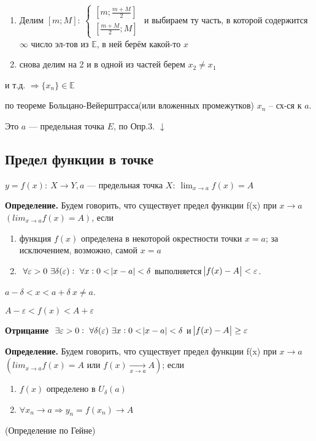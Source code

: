 \documentclass{article}
\begin{document}
  \begin{enumerate}
      \item Делим \([m; M]:\ \begin{cases}[m; \frac{m+M}{2}]\\ [\frac{m+M}{2}; M]\end{cases}\)
      и выбираем ту часть, в которой содержится \(\infty\) число эл-тов из \(\mathbb{E}\), в ней берём какой-то \(x\)
      \item снова делим на 2 и в одной из частей берем \(x_2 \neq x_1\)
  \end{enumerate}
  и т.д. \(\Rightarrow \{x_n\} \in \mathbb{E}\)

  по теореме Больцано-Вейерштрасса(или вложенных промежутков) \(x_n\) -- сх-ся к \(a\).

  Это \(a\) --- предельная точка \(E\), по Опр.3.
  \(\downarrow\)

  \subsection{Предел функции в точке}

  \(y=f(x):\ X \rightarrow Y, a\) --- предельная точка \(X:\ \lim_{x \rightarrow a}{f(x)} = A\)

  \textbf{Определение.} Будем говорить, что существует предел функции f(x) при \(x \rightarrow a\) \( (lim_{x\rightarrow a} f(x) = A) \), если

  \begin{enumerate}
      \item функция \(f(x)\) определена в некоторой окрестности точки \(x=a\); за исключением, возможно, самой \(x=a\)
      \item \(\ \forall \varepsilon > 0\ \exists \delta(\varepsilon):\ \forall x: 0 < \abs{x - a} < \delta\) выполняется \(\abs{f(x) - A} < \varepsilon\).
  \end{enumerate}
  \(a - \delta < x < a + \delta\ x \neq a\).

  \(A - \varepsilon < f(x) < A + \varepsilon\)

  \textbf{Отрицание} \(\ \exists \varepsilon > 0:\ \forall \delta(\varepsilon)\ \exists x: 0 < \abs{x - a} < \delta\) и \(\abs{f(x) - A} \geq \varepsilon\)

  \textbf{Определение.} Будем говорить, что существует предел функции f(x) при \(x \rightarrow a\) \( (lim_{x\rightarrow a} f(x) = A \textrm{ или } f(x) \xrightarrow[x \rightarrow a]{} A)\); если

  \begin{enumerate}
    \item \(f(x)\) определено в \(U_\delta(a)\)
    \item \(\forall x_n \rightarrow a \Rightarrow y_n = f(x_n)\rightarrow A\)
  \end{enumerate}
  (Определение по Гейне)
\end{document}
